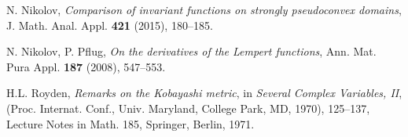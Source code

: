 \documentclass[a4paper,12pt]{amsart}
\begin{document}
\begin{thebibliography}{}
 N. Nikolov, {\it Comparison of invariant functions on strongly pseudoconvex domains}, J. Math. Anal. Appl. {\bf 421} (2015), 180--185.

 N. Nikolov, P. Pflug, {\it On the derivatives of the Lempert functions},
Ann. Mat. Pura Appl. {\bf 187} (2008), 547--553.

  H.L. Royden, {\it Remarks on the Kobayashi metric}, in {\it Several Complex Variables, II}, (Proc. Internat. Conf., Univ.
Maryland, College Park, MD, 1970), 125--137, Lecture Notes in Math. 185, Springer, Berlin, 1971.


\end{thebibliography}{}
\end{document}
